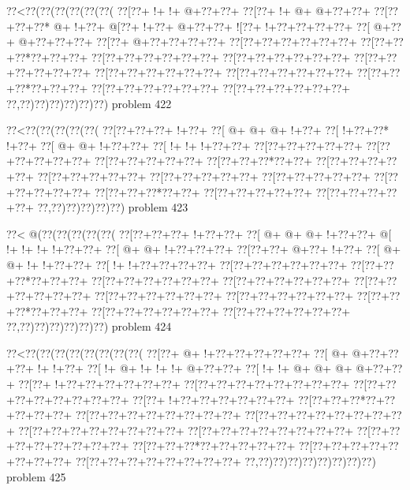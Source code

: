 \vbox{\vbox{\goo
\0??<\0??(\0??(\0??(\0??(\0??(\0??(
\0??[\0??+\- !+\- !+\- @+\0??+\0??+
\0??[\0??+\- !+\- @+\- @+\0??+\0??+
\0??[\0??+\0??+\0??*\- @+\- !+\0??+
\- @[\0??+\- !+\0??+\- @+\0??+\0??+
\- ![\0??+\- !+\0??+\0??+\0??+\0??+
\0??[\- @+\0??+\- @+\0??+\0??+\0??+
\0??[\0??+\- @+\0??+\0??+\0??+\0??+
\0??[\0??+\0??+\0??+\0??+\0??+\0??+
\0??[\0??+\0??+\0??*\0??+\0??+\0??+
\0??[\0??+\0??+\0??+\0??+\0??+\0??+
\0??[\0??+\0??+\0??+\0??+\0??+\0??+
\0??[\0??+\0??+\0??+\0??+\0??+\0??+
\0??[\0??+\0??+\0??+\0??+\0??+\0??+
\0??[\0??+\0??+\0??+\0??+\0??+\0??+
\0??[\0??+\0??+\0??*\0??+\0??+\0??+
\0??[\0??+\0??+\0??+\0??+\0??+\0??+
\0??[\0??+\0??+\0??+\0??+\0??+\0??+
\0??,\0??)\0??)\0??)\0??)\0??)\0??)
}
\hfil problem 422\hfil\break
}

\vbox{\vbox{\goo
\0??<\0??(\0??(\0??(\0??(\0??(
\0??[\0??+\0??+\0??+\- !+\0??+
\0??[\- @+\- @+\- @+\- !+\0??+
\0??[\- !+\0??+\0??*\- !+\0??+
\0??[\- @+\- @+\- !+\0??+\0??+
\0??[\- !+\- !+\- !+\0??+\0??+
\0??[\0??+\0??+\0??+\0??+\0??+
\0??[\0??+\0??+\0??+\0??+\0??+
\0??[\0??+\0??+\0??+\0??+\0??+
\0??[\0??+\0??+\0??*\0??+\0??+
\0??[\0??+\0??+\0??+\0??+\0??+
\0??[\0??+\0??+\0??+\0??+\0??+
\0??[\0??+\0??+\0??+\0??+\0??+
\0??[\0??+\0??+\0??+\0??+\0??+
\0??[\0??+\0??+\0??+\0??+\0??+
\0??[\0??+\0??+\0??*\0??+\0??+
\0??[\0??+\0??+\0??+\0??+\0??+
\0??[\0??+\0??+\0??+\0??+\0??+
\0??,\0??)\0??)\0??)\0??)\0??)
}
\hfil problem 423\hfil\break
}

\vbox{\vbox{\goo
\0??<\- @(\0??(\0??(\0??(\0??(\0??(
\0??[\0??+\0??+\0??+\- !+\0??+\0??+
\0??[\- @+\- @+\- @+\- !+\0??+\0??+
\- @[\- !+\- !+\- !+\- !+\0??+\0??+
\0??[\- @+\- @+\- !+\0??+\0??+\0??+
\0??[\0??+\0??+\- @+\0??+\- !+\0??+
\0??[\- @+\- @+\- !+\- !+\0??+\0??+
\0??[\- !+\- !+\0??+\0??+\0??+\0??+
\0??[\0??+\0??+\0??+\0??+\0??+\0??+
\0??[\0??+\0??+\0??*\0??+\0??+\0??+
\0??[\0??+\0??+\0??+\0??+\0??+\0??+
\0??[\0??+\0??+\0??+\0??+\0??+\0??+
\0??[\0??+\0??+\0??+\0??+\0??+\0??+
\0??[\0??+\0??+\0??+\0??+\0??+\0??+
\0??[\0??+\0??+\0??+\0??+\0??+\0??+
\0??[\0??+\0??+\0??*\0??+\0??+\0??+
\0??[\0??+\0??+\0??+\0??+\0??+\0??+
\0??[\0??+\0??+\0??+\0??+\0??+\0??+
\0??,\0??)\0??)\0??)\0??)\0??)\0??)
}
\hfil problem 424\hfil\break
}

\vbox{\vbox{\goo
\0??<\0??(\0??(\0??(\0??(\0??(\0??(\0??(\0??(
\0??[\0??+\- @+\- !+\0??+\0??+\0??+\0??+\0??+
\0??[\- @+\- @+\0??+\0??+\0??+\- !+\- !+\0??+
\0??[\- !+\- @+\- !+\- !+\- !+\- @+\0??+\0??+
\0??[\- !+\- !+\- @+\- @+\- @+\- @+\0??+\0??+
\0??[\0??+\- !+\0??+\0??+\0??+\0??+\0??+\0??+
\0??[\0??+\0??+\0??+\0??+\0??+\0??+\0??+\0??+
\0??[\0??+\0??+\0??+\0??+\0??+\0??+\0??+\0??+
\0??[\0??+\- !+\0??+\0??+\0??+\0??+\0??+\0??+
\0??[\0??+\0??+\0??*\0??+\0??+\0??+\0??+\0??+
\0??[\0??+\0??+\0??+\0??+\0??+\0??+\0??+\0??+
\0??[\0??+\0??+\0??+\0??+\0??+\0??+\0??+\0??+
\0??[\0??+\0??+\0??+\0??+\0??+\0??+\0??+\0??+
\0??[\0??+\0??+\0??+\0??+\0??+\0??+\0??+\0??+
\0??[\0??+\0??+\0??+\0??+\0??+\0??+\0??+\0??+
\0??[\0??+\0??+\0??*\0??+\0??+\0??+\0??+\0??+
\0??[\0??+\0??+\0??+\0??+\0??+\0??+\0??+\0??+
\0??[\0??+\0??+\0??+\0??+\0??+\0??+\0??+\0??+
\0??,\0??)\0??)\0??)\0??)\0??)\0??)\0??)\0??)
}
\hfil problem 425\hfil\break
}

